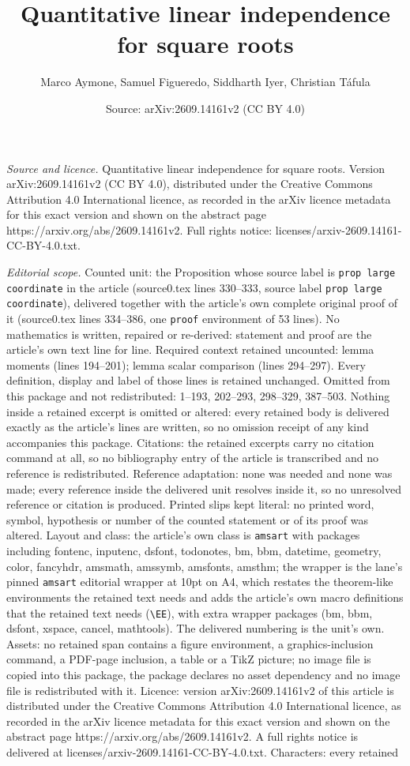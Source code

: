 \documentclass[10pt,a4paper]{amsart}
\title[Quantitative linear independence for square roots]{Quantitative linear independence for square roots}
\author{Marco Aymone, Samuel Figueredo, Siddharth Iyer, Christian T\'afula}
\date{Source: arXiv:2609.14161v2 (CC BY 4.0)}
\begin{document}
\maketitle

\noindent\emph{Source and licence.} Quantitative linear independence for square roots. Version arXiv:2609.14161v2 (CC BY 4.0), distributed under the Creative Commons Attribution 4.0 International licence, as recorded in the arXiv licence metadata for this exact version and shown on the abstract page https://arxiv.org/abs/2609.14161v2. Full rights notice: licenses/arxiv-2609.14161-CC-BY-4.0.txt.\par\smallskip

\noindent\textit{Editorial scope.} Counted unit: the Proposition whose source label is \texttt{prop large coordinate} in the article (source0.tex lines 330--333, source label \texttt{prop large coordinate}), delivered together with the article's own complete original proof of it (source0.tex lines 334--386, one \texttt{proof} environment of 53 lines). No mathematics is written, repaired or re-derived: statement and proof are the article's own text line for line. Required context retained uncounted: lemma moments (lines 194--201); lemma scalar comparison (lines 294--297). Every definition, display and label of those lines is retained unchanged. Omitted from this package and not redistributed: 1--193, 202--293, 298--329, 387--503. Nothing inside a retained excerpt is omitted or altered: every retained body is delivered exactly as the article's lines are written, so no omission receipt of any kind accompanies this package. Citations: the retained excerpts carry no citation command at all, so no bibliography entry of the article is transcribed and no reference is redistributed. Reference adaptation: none was needed and none was made; every reference inside the delivered unit resolves inside it, so no unresolved reference or citation is produced. Printed slips kept literal: no printed word, symbol, hypothesis or number of the counted statement or of its proof was altered. Layout and class: the article's own class is \texttt{amsart} with packages including fontenc, inputenc, dsfont, todonotes, bm, bbm, datetime, geometry, color, fancyhdr, amsmath, amssymb, amsfonts, amsthm; the wrapper is the lane's pinned \texttt{amsart} editorial wrapper at 10pt on A4, which restates the theorem-like environments the retained text needs and adds the article's own macro definitions that the retained text needs (\texttt{\textbackslash EE}), with extra wrapper packages (bm, bbm, dsfont, xspace, cancel, mathtools). The delivered numbering is the unit's own. Assets: no retained span contains a figure environment, a graphics-inclusion command, a PDF-page inclusion, a table or a TikZ picture; no image file is copied into this package, the package declares no asset dependency and no image file is redistributed with it. Licence: version arXiv:2609.14161v2 of this article is distributed under the Creative Commons Attribution 4.0 International licence, as recorded in the arXiv licence metadata for this exact version and shown on the abstract page https://arxiv.org/abs/2609.14161v2. A full rights notice is delivered at licenses/arxiv-2609.14161-CC-BY-4.0.txt. Characters: every retained 
\end{document}
